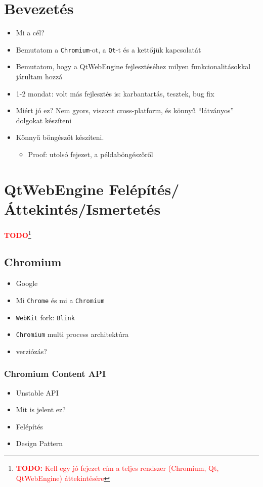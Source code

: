 \documentclass[12pt]{report}
\newcommand{\todo}[1]{%
    \textcolor{red}{\textbf{TODO}}\footnote{\textcolor{red}{\textbf{TODO:} #1}}
}
\begin{document}
\chapter*{Bevezetés}
\begin{itemize}
    \item Mi a cél?
    \item Bemutatom a \texttt{Chromium}-ot, a \texttt{Qt}-t és a kettőjük kapcsolatát
    \item Bemutatom, hogy a QtWebEngine fejlesztéséhez milyen funkcionalitásokkal járultam
        hozzá
    \item 1-2 mondat: volt más fejlesztés is: karbantartás, tesztek, bug fix
    \item Miért jó ez? Nem gyors, viszont cross-platform, és könnyű ``látványos'' dolgokat
        készíteni
    \item Könnyű böngészőt készíteni.
        \begin{itemize}
            \item Proof: utolsó fejezet, a példaböngészőről
        \end{itemize}
\end{itemize}



\chapter{QtWebEngine Felépítés/Áttekintés/Ismertetés}
\todo{Kell egy jó fejezet cím a teljes rendszer (Chromium, Qt, QtWebEngine) áttekintésére}

\section{Chromium}
\begin{itemize}
    \item Google
    \item Mi \texttt{Chrome} és mi a \texttt{Chromium}
    \item \texttt{WebKit} fork: \texttt{Blink}
    \item \texttt{Chromium} multi process architektúra
    \item verziózás?
\end{itemize}

\subsection{Chromium Content API}
\begin{itemize}
    \item Unstable API
    \item Mit is jelent ez?
    \item Felépítés
    \item Design Pattern
\end{itemize}
\end{document}
